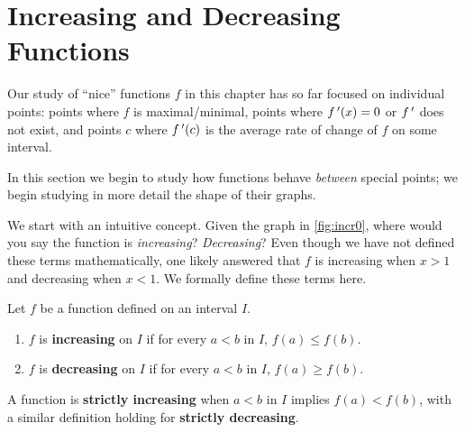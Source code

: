 \section{Increasing and Decreasing Functions}\label{sec:incr_decr}

Our study of ``nice'' functions $f$ in this chapter has so far focused on individual points: points where $f$ is maximal/minimal, points where $f\,'(x) = 0$ or $f\,'$ does not exist, and points $c$ where $f\,'(c)$ is the average rate of change of $f$ on some interval. 

In this section we begin to study how functions behave \emph{between} special points; we begin studying in more detail the shape of their graphs. 


We start with an intuitive concept. Given the graph in \autoref{fig:incr0}, where would you say the function is \emph{increasing}? \emph{Decreasing}? Even though we have not defined these terms mathematically, one likely answered that $f$ is increasing when $x>1$ and decreasing when $x<1$. We formally define these terms here.

\begin{definition}\label{def:incr_decr}%
Let $f$ be a function defined on an interval $I$.
\begin{enumerate}
	\item	$f$ is \textbf{increasing} on $I$ if for every $a<b$ in $I$, $f(a) \leq f(b)$.
	\item	$f$ is \textbf{decreasing} on $I$ if for every $a<b$ in $I$, $f(a) \geq f(b)$.
\end{enumerate}
A function is \textbf{strictly increasing} when $a<b$ in $I$ implies $f(a) < f(b)$, with a similar definition holding for \textbf{strictly decreasing}.
\end{definition}

